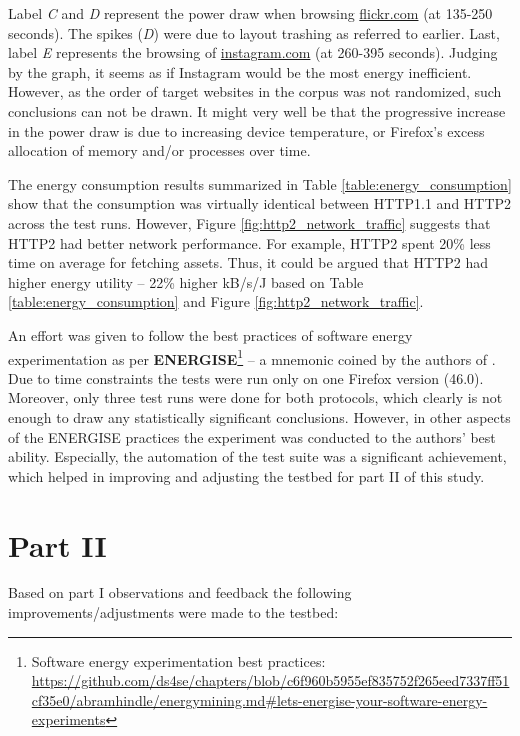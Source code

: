 \documentclass{article}
\begin{document}
Label \emph{C} and \emph{D} represent the power draw when browsing \url{flickr.com} (at 135-250 seconds). The spikes (\emph{D}) were due to layout trashing as referred to earlier. Last, label \emph{E} represents the browsing of \url{instagram.com} (at 260-395 seconds). Judging by the graph, it seems as if Instagram would be the most energy inefficient. However, as the order of target websites in the corpus was not randomized, such conclusions can not be drawn. It might very well be that the progressive increase in the power draw is due to increasing device temperature, or Firefox's excess allocation of memory and/or processes over time.

The energy consumption results summarized in Table \ref{table:energy_consumption} show that the consumption was virtually identical between HTTP1.1 and HTTP2 across the test runs. However, Figure \ref{fig:http2_network_traffic} suggests that HTTP2 had better network performance. For example, HTTP2 spent 20\% less time on average for fetching assets. Thus, it could be argued that HTTP2 had higher energy utility -- 22\% higher kB/s/J based on Table \ref{table:energy_consumption} and Figure \ref{fig:http2_network_traffic}.

An effort was given to follow the best practices of software energy experimentation as per \textbf{ENERGISE}\footnote{Software energy experimentation best practices: \url{https://github.com/ds4se/chapters/blob/c6f960b5955ef835752f265eed7337ff51cf35e0/abramhindle/energymining.md\#lets-energise-your-software-energy-experiments}} -- a mnemonic coined by the authors of \cite{greenminer}. Due to time constraints the tests were run only on one Firefox version (46.0). Moreover, only three test runs were done for both protocols, which clearly is not enough to draw any statistically significant conclusions. However, in other aspects of the ENERGISE practices the experiment was conducted to the authors' best ability. Especially, the automation of the test suite was a significant achievement, which helped in improving and adjusting the testbed for part II of this study.

\section{Part II}

Based on part I observations and feedback the following improvements/adjustments were made to the testbed:
\end{document}
